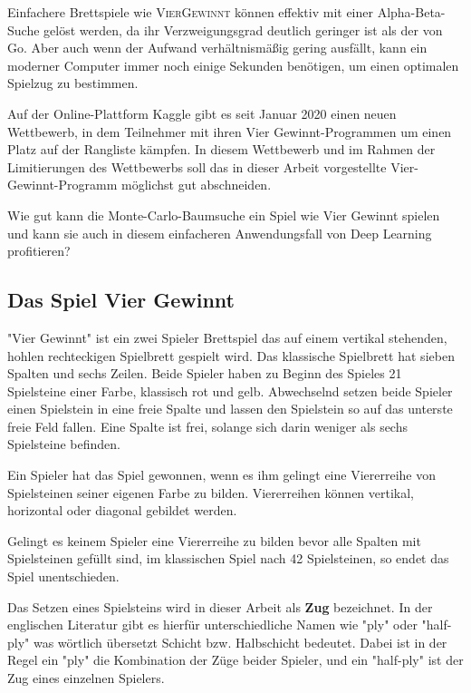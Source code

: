 Einfachere Brettspiele wie \textsc{VierGewinnt} können effektiv mit einer Alpha-Beta-Suche gelöst werden, da ihr Verzweigungsgrad deutlich geringer ist als der von Go. Aber auch wenn der Aufwand verhältnismäßig gering ausfällt, kann ein moderner Computer immer noch einige Sekunden benötigen, um einen optimalen Spielzug zu bestimmen.

Auf der Online-Plattform Kaggle gibt es seit Januar 2020 einen neuen Wettbewerb, in dem Teilnehmer mit ihren Vier Gewinnt-Programmen um einen Platz auf der Rangliste kämpfen. In diesem Wettbewerb und im Rahmen der Limitierungen des Wettbewerbs soll das in dieser Arbeit vorgestellte Vier-Gewinnt-Programm möglichst gut abschneiden.

Wie gut kann die Monte-Carlo-Baumsuche ein Spiel wie Vier Gewinnt spielen und kann sie auch in diesem einfacheren Anwendungsfall von Deep Learning profitieren? 

\subsection{Das Spiel Vier Gewinnt}
"Vier Gewinnt" ist ein zwei Spieler Brettspiel das auf einem vertikal stehenden, hohlen rechteckigen Spielbrett gespielt wird. Das klassische Spielbrett hat sieben Spalten und sechs Zeilen. Beide Spieler haben zu Beginn des Spieles 21 Spielsteine einer Farbe, klassisch rot und gelb. Abwechselnd setzen beide Spieler einen Spielstein in eine freie Spalte und lassen den Spielstein so auf das unterste freie Feld fallen. Eine Spalte ist frei, solange sich darin weniger als sechs Spielsteine befinden.

Ein Spieler hat das Spiel gewonnen, wenn es ihm gelingt eine Viererreihe von Spielsteinen seiner eigenen Farbe zu bilden. Viererreihen können vertikal, horizontal oder diagonal gebildet werden.

Gelingt es keinem Spieler eine Viererreihe zu bilden bevor alle Spalten mit Spielsteinen gefüllt sind, im klassischen Spiel nach 42 Spielsteinen, so endet das Spiel unentschieden.

Das Setzen eines Spielsteins wird in dieser Arbeit als \textbf{Zug} bezeichnet. In der englischen Literatur gibt es hierfür unterschiedliche Namen wie "ply" oder "half-ply" was wörtlich übersetzt Schicht bzw. Halbschicht bedeutet. Dabei ist in der Regel ein "ply" die Kombination der Züge beider Spieler, und ein "half-ply" ist der Zug eines einzelnen Spielers.

